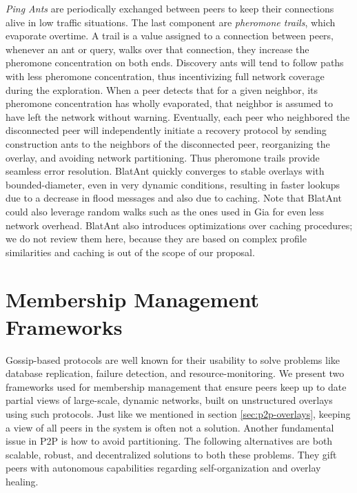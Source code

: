\documentclass[runningheads]{llncs}
\begin{document}
\textit{Ping Ants} are periodically exchanged between peers to keep their connections alive in low traffic situations. The last component are \textit{pheromone trails}, which evaporate overtime. A trail is a value assigned to a connection between peers, whenever an ant or query, walks over that connection, they increase the pheromone concentration on both ends. Discovery ants will tend to follow paths with less pheromone concentration, thus incentivizing full network coverage during the exploration. When a peer detects that for a given neighbor, its pheromone concentration has wholly evaporated, that neighbor is assumed to have left the network without warning. Eventually, each peer who neighbored the disconnected peer will independently initiate a recovery protocol by sending construction ants to the neighbors of the disconnected peer, reorganizing the overlay, and avoiding network partitioning. Thus pheromone trails provide seamless error resolution. BlatAnt quickly converges to stable overlays with bounded-diameter, even in very dynamic conditions, resulting in faster lookups due to a decrease in flood messages and also due to caching. Note that BlatAnt could also leverage random walks such as the ones used in Gia for even less network overhead. BlatAnt also introduces optimizations over caching procedures; we do not review them here, because they are based on complex profile similarities and caching is out of the scope of our proposal.

\section{Membership Management Frameworks}\label{sec:membership-management}
Gossip-based protocols are well known for their usability to solve problems like database replication, failure detection, and resource-monitoring. We present two frameworks used for membership management that ensure peers keep up to date partial views of large-scale, dynamic networks, built on unstructured overlays using such protocols. Just like we mentioned in section \ref{sec:p2p-overlays}, keeping a view of all peers in the system is often not a solution. Another fundamental issue in P2P is how to avoid partitioning. The following alternatives are both scalable, robust, and decentralized solutions to both these problems. They gift peers with autonomous capabilities regarding self-organization and overlay healing.
\end{document}
